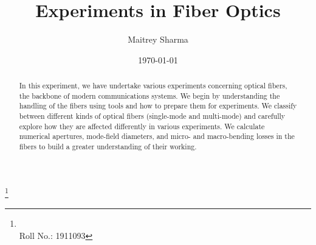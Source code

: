 \documentclass[%
 reprint,
nofootinbib,
 amsmath,amssymb,
 aps,
]{revtex4-2}
\begin{document}

\title{Experiments in Fiber Optics}%

\author{Maitrey Sharma}
\thanks{\\Roll No.: 1911093}
%



\date{\today}%

\begin{abstract}
In this experiment, we have undertake various experiments concerning optical fibers, the backbone of modern communications systems. We begin by understanding  the handling of the fibers using tools and how to prepare them for experiments. We classify between different kinds of optical fibers (single-mode and multi-mode) and carefully explore how they are affected differently in various experiments. We calculate numerical apertures, mode-field diameters, and micro- and macro-bending losses in the fibers to build a greater understanding of their working.
\end{abstract}
\end{document}
